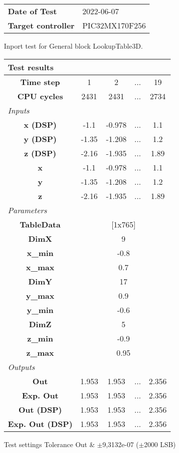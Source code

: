 \begin{tabular}{l l}
\textbf{Date of Test} & 2022-06-07 \tabularnewline
\textbf{Target controller} & PIC32MX170F256 \tabularnewline
\end{tabular}
\vspace{1ex}
Inport test for General block LookupTable3D.

\vspace{1em}
\begin{tabularx}{\textwidth}{|c|c|c|>{\centering\arraybackslash}X|c|}
\hline
\multicolumn{5}{|l|}{\cellcolor[gray]{0.8}\textbf{Test results}} \tabularnewline \hline
\textbf{Time step} & 1 & 2 & ... & 19 \tabularnewline \hline
\textbf{CPU cycles} & 2431 & 2431 & ... & 2734 \tabularnewline \hline
\multicolumn{5}{|l|}{\cellcolor[gray]{0.9}\textit{Inputs}} \tabularnewline \hline
\textbf{x (DSP)} & -1.1 & -0.978 & ... & 1.1 \tabularnewline \hline
\textbf{y (DSP)} & -1.35 & -1.208 & ... & 1.2 \tabularnewline \hline
\textbf{z (DSP)} & -2.16 & -1.935 & ... & 1.89 \tabularnewline \hline
\textbf{x} & -1.1 & -0.978 & ... & 1.1 \tabularnewline \hline
\textbf{y} & -1.35 & -1.208 & ... & 1.2 \tabularnewline \hline
\textbf{z} & -2.16 & -1.935 & ... & 1.89 \tabularnewline \hline
\multicolumn{5}{|l|}{\cellcolor[gray]{0.9}\textit{Parameters}} \tabularnewline \hline
\textbf{TableData} & \multicolumn{4}{c|}{[1x765]} \tabularnewline \hline
\textbf{DimX} & \multicolumn{4}{c|}{9} \tabularnewline \hline
\textbf{x\_min} & \multicolumn{4}{c|}{-0.8} \tabularnewline \hline
\textbf{x\_max} & \multicolumn{4}{c|}{0.7} \tabularnewline \hline
\textbf{DimY} & \multicolumn{4}{c|}{17} \tabularnewline \hline
\textbf{y\_max} & \multicolumn{4}{c|}{0.9} \tabularnewline \hline
\textbf{y\_min} & \multicolumn{4}{c|}{-0.6} \tabularnewline \hline
\textbf{DimZ} & \multicolumn{4}{c|}{5} \tabularnewline \hline
\textbf{z\_min} & \multicolumn{4}{c|}{-0.9} \tabularnewline \hline
\textbf{z\_max} & \multicolumn{4}{c|}{0.95} \tabularnewline \hline
\multicolumn{5}{|l|}{\cellcolor[gray]{0.9}\textit{Outputs}} \tabularnewline \hline
\textbf{Out} & 1.953 & 1.953 & ... & 2.356 \tabularnewline \hline
\textbf{Exp. Out} & 1.953 & 1.953 & ... & 2.356 \tabularnewline \hline
\textbf{Out (DSP)} & 1.953 & 1.953 & ... & 2.356 \tabularnewline \hline
\textbf{Exp. Out (DSP)} & 1.953 & 1.953 & ... & 2.356 \tabularnewline \hline
\end{tabularx}
\vspace{1ex}

\begin{XtoCtabular}{Test settings}
Tolerance Out & $\pm$9,3132e-07 ($\pm$2000 LSB) \tabularnewline \hline
\end{XtoCtabular}

